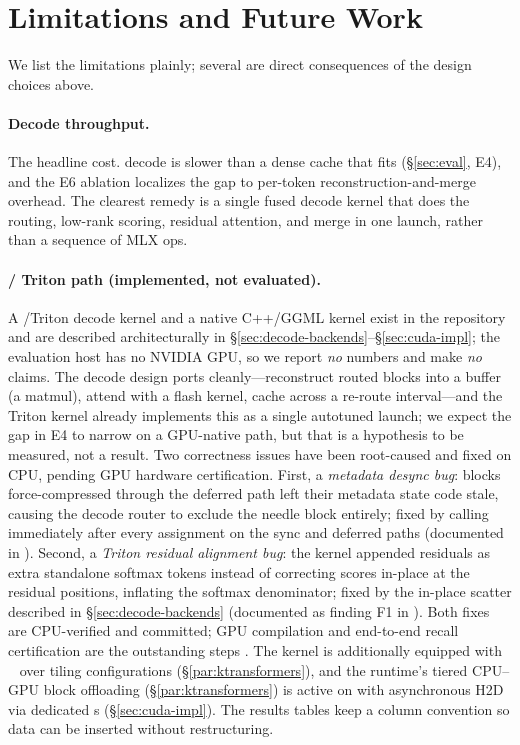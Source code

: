 \section{Limitations and Future Work}
\label{sec:limits}

We list the limitations plainly; several are direct consequences of the design choices above.

\paragraph{Decode throughput.} The headline cost. \dkv{} decode is slower than a dense cache
that fits (\S\ref{sec:eval}, E4), and the E6 ablation localizes the gap to per-token
reconstruction-and-merge overhead. The clearest remedy is a single fused decode kernel that does
the routing, low-rank scoring, residual attention, and merge in one launch, rather than a sequence
of MLX ops.

\paragraph{\cuda{} / Triton path (implemented, not evaluated).}
A \cuda{}/Triton decode kernel and a native C++/GGML kernel exist in the repository and are
described architecturally in \S\ref{sec:decode-backends}--\S\ref{sec:cuda-impl}; the evaluation
host has no NVIDIA GPU, so we report \emph{no} \cuda{} numbers and make \emph{no} \cuda{} claims.
The decode design ports cleanly---reconstruct routed blocks into a buffer (a matmul), attend with
a flash kernel, cache across a re-route interval---and the Triton kernel already implements this
as a single autotuned launch; we expect the gap in E4 to narrow on a GPU-native path, but that is
a hypothesis to be measured, not a result.
Two correctness issues have been root-caused and fixed on CPU, pending GPU hardware certification.
First, a \emph{metadata desync bug}: blocks force-compressed through the deferred path left their
metadata state code stale, causing the decode router to exclude the needle block entirely; fixed
by calling  immediately after every 
assignment on the sync and deferred paths (documented in
).
Second, a \emph{Triton residual alignment bug}: the kernel appended residuals as extra standalone
softmax tokens instead of correcting scores in-place at the residual positions, inflating the
softmax denominator; fixed by the in-place scatter described in \S\ref{sec:decode-backends}
(documented as finding F1 in ).
Both fixes are CPU-verified and committed; GPU compilation and end-to-end recall certification
are the outstanding steps \pendingGPU{}.
The kernel is additionally equipped with ~\cite{tillet2019triton}
over tiling configurations (\S\ref{par:ktransformers}), and the runtime's tiered CPU--GPU
block offloading (\S\ref{par:ktransformers}) is active on \cuda{} with asynchronous H2D via
dedicated s (\S\ref{sec:cuda-impl}).
The results tables keep a column convention so \cuda{} data can be inserted without restructuring.


